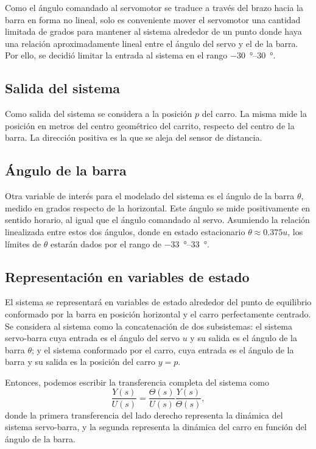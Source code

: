 Como el ángulo comandado al servomotor se traduce a través del brazo hacia la barra en forma no lineal, solo es conveniente mover el servomotor una cantidad limitada de grados para mantener al sistema alrededor de un punto donde haya una relación aproximadamente lineal entre el ángulo del servo y el de la barra. Por ello, se decidió limitar la entrada al sistema en el rango \qtyrange{-30}{30}{\degree}.

\subsection{Salida del sistema}

Como salida del sistema se considera a la posición $p$ del carro. La misma mide la posición en metros del centro geométrico del carrito, respecto del centro de la barra. La dirección positiva es la que se aleja del sensor de distancia.

\subsection{Ángulo de la barra}

Otra variable de interés para el modelado del sistema es el ángulo de la barra $\theta$, medido en grados respecto de la horizontal. Este ángulo se mide positivamente en sentido horario, al igual que el ángulo comandado al servo. Asumiendo la relación linealizada entre estos dos ángulos, donde en estado estacionario $\theta \approx 0.375 u$, los límites de $\theta$ estarán dados por el rango de \qtyrange{-33}{33}{\degree}.

\subsection{Representación en variables de estado}

El sistema se representará en variables de estado alrededor del punto de equilibrio conformado por la barra en posición horizontal y el carro perfectamente centrado. Se considera al sistema como la concatenación de dos subsistemas: el sistema servo-barra cuya entrada es el ángulo del servo $u$ y su salida es el ángulo de la barra $\theta$; y el sistema conformado por el carro, cuya entrada es el ángulo de la barra y su salida es la posición del carro $y = p$.

Entonces, podemos escribir la transferencia completa del sistema como
\[
    \frac{Y(s)}{U(s)} = \frac{\Theta(s)}{U(s)} \frac{Y(s)}{\Theta(s)},
\]
donde la primera transferencia del lado derecho representa la dinámica del sistema servo-barra, y la segunda representa la dinámica del carro en función del ángulo de la barra.

